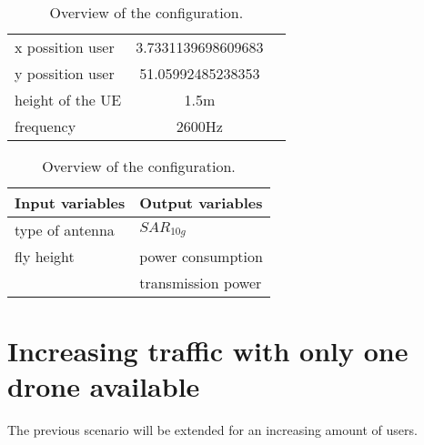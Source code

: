 \begin{table}[!htb]
    \begin{minipage}{.5\linewidth}
      \centering
        \begin{tabular}{|l|c|l|}
        \hline
        x possition user               & 3.7331139698609683        \\    
        y possition user               & 51.05992485238353           \\ 
        height of the \gls{UE}         & 1.5m                      \\ 
        frequency                      & 2600Hz                   \\ 
        \hline
        \end{tabular}
    \end{minipage}%
    \begin{minipage}{.5\linewidth}
      \centering
            \begin{tabular}{|l|l|}
            \hline
            Input variables                & Output variables          \\   \hline 
            type of antenna                & $SAR_{10g}$               \\ 
            fly height                     & power consumption             \\ 
                                           & transmission power            \\ 
            \hline
            \end{tabular}
    \end{minipage} 
        \caption{Overview of the configuration.}
        \label{table:confOverviewScenario1}
\end{table}




\section{Increasing traffic with only one drone available}
The previous scenario will be extended for an increasing amount of users. 

